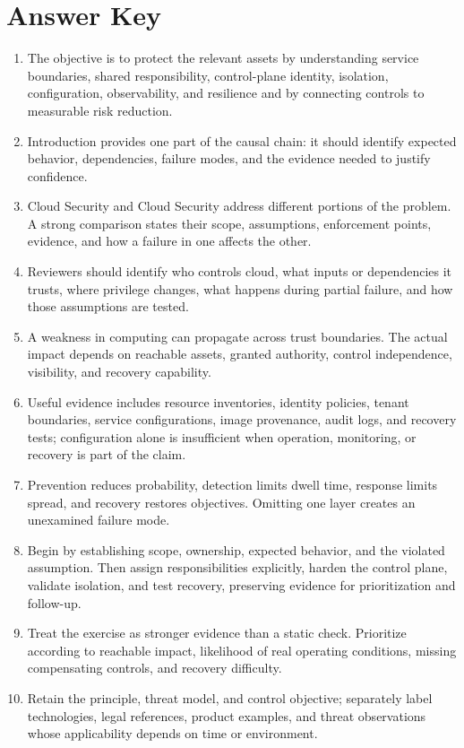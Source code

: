 \documentclass[11pt,letterpaper]{article}
\begin{document}
\section*{Answer Key}
\begin{enumerate}
\item The objective is to protect the relevant assets by understanding service boundaries, shared responsibility, control-plane identity, isolation, configuration, observability, and resilience and by connecting controls to measurable risk reduction.
\item Introduction provides one part of the causal chain: it should identify expected behavior, dependencies, failure modes, and the evidence needed to justify confidence.
\item Cloud Security and Cloud Security address different portions of the problem. A strong comparison states their scope, assumptions, enforcement points, evidence, and how a failure in one affects the other.
\item Reviewers should identify who controls cloud, what inputs or dependencies it trusts, where privilege changes, what happens during partial failure, and how those assumptions are tested.
\item A weakness in computing can propagate across trust boundaries. The actual impact depends on reachable assets, granted authority, control independence, visibility, and recovery capability.
\item Useful evidence includes resource inventories, identity policies, tenant boundaries, service configurations, image provenance, audit logs, and recovery tests; configuration alone is insufficient when operation, monitoring, or recovery is part of the claim.
\item Prevention reduces probability, detection limits dwell time, response limits spread, and recovery restores objectives. Omitting one layer creates an unexamined failure mode.
\item Begin by establishing scope, ownership, expected behavior, and the violated assumption. Then assign responsibilities explicitly, harden the control plane, validate isolation, and test recovery, preserving evidence for prioritization and follow-up.
\item Treat the exercise as stronger evidence than a static check. Prioritize according to reachable impact, likelihood of real operating conditions, missing compensating controls, and recovery difficulty.
\item Retain the principle, threat model, and control objective; separately label technologies, legal references, product examples, and threat observations whose applicability depends on time or environment.
\end{enumerate}
\end{document}
